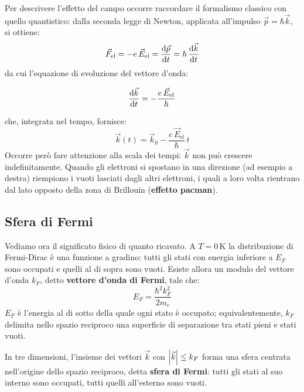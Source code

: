 Per descrivere l'effetto del campo occorre raccordare il formalismo classico con quello quantistico: dalla seconda legge di Newton, applicata all'impulso \(\vec{p} = \hbar \vec{k}\), si ottiene:
\begin{equation}
    \vec{F}_{\text{el}} = -e\, \vec{E}_{\text{el}} = \dv{\vec{p}}{t} = \hbar\, \dv{\vec{k}}{t}
\end{equation}
da cui l'equazione di evoluzione del vettore d'onda:
\begin{importantbox}
    \begin{equation}
        \dv{\vec{k}}{t} = -\frac{e\, \vec{E}_{\text{el}}}{\hbar}
    \end{equation}
\end{importantbox}
che, integrata nel tempo, fornisce:
\begin{equation}
    \vec{k}(t) = \vec{k}_0 - \frac{e\, \vec{E}_{\text{el}}}{\hbar}\, t
\end{equation}
Occorre però fare attenzione alla scala dei tempi: \(\vec{k}\) non può crescere indefinitamente. Quando gli elettroni si spostano in una direzione (ad esempio a destra) riempiono i vuoti lasciati dagli altri elettroni, i quali a loro volta rientrano dal lato opposto della zona di Brillouin (\textbf{effetto pacman}).

\subsection{Sfera di Fermi}

Vediamo ora il significato fisico di quanto ricavato. A \(T = 0\,\text{K}\) la distribuzione di Fermi-Dirac è una funzione a gradino: tutti gli stati con energia inferiore a \(E_F\) sono occupati e quelli al di sopra sono vuoti. Esiste allora un modulo del vettore d'onda \(k_F\), detto \textbf{vettore d'onda di Fermi}, tale che:
\begin{equation}
    E_F = \frac{\hbar^2 k_F^2}{2 m_e}
\end{equation}
\(E_F\) è l'energia al di sotto della quale ogni stato è occupato; equivalentemente, \(k_F\) delimita nello spazio reciproco una superficie di separazione tra stati pieni e stati vuoti.

In tre dimensioni, l'insieme dei vettori \(\vec{k}\) con \(\abs{\vec{k}} \leq k_F\) forma una sfera centrata nell'origine dello spazio reciproco, detta \textbf{sfera di Fermi}: tutti gli stati al suo interno sono occupati, tutti quelli all'esterno sono vuoti.

